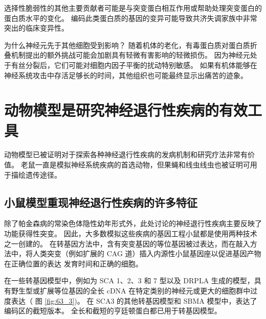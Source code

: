 选择性脆弱性的其他主要贡献者可能是与突变蛋白相互作用或帮助处理突变蛋白的蛋白质水平的变化。
编码此类蛋白质的基因的变异可能导致共济失调家族中非常突出的临床变异性。


为什么神经元先于其他细胞受到影响？
随着机体的老化，有毒蛋白质对蛋白质折叠机制提出的额外挑战可能会加剧具有轻微有害影响的轻微损伤。
因为神经元处于有丝分裂后，它们可能对细胞内因子平衡的扰动特别敏感。
如果有机体能够在神经系统攻击中存活足够长的时间，其他组织也可能最终显示出痛苦的迹象。



\section{动物模型是研究神经退行性疾病的有效工具}

动物模型已被证明对于探索各种神经退行性疾病的发病机制和研究疗法非常有价值。
老鼠一直是模拟神经系统疾病的首选动物，但果蝇和线虫线虫也被证明可用于描绘遗传途径。



\subsection{小鼠模型重现神经退行性疾病的许多特征}

除了帕金森病的常染色体隐性幼年形式外，此处讨论的神经退行性疾病主要反映了功能获得性突变。
因此，大多数模拟这些疾病的基因工程小鼠都是使用两种技术之一创建的。
在转基因方法中，含有突变基因的等位基因被过表达，而在敲入方法中，将人类突变（例如扩展的 CAG 道）插入内源性小鼠基因座以促进基因产物在正确位置的表达 发育时间和正确的细胞。


在一些转基因模型中，例如为 SCA 1、2、3 和 7 型以及 DRPLA 生成的模型，具有野生型或扩展等位基因的全长 cDNA 在特定类别的神经元或更大的细胞群中过度表达（ 图 \ref{fig:63_3})。
在 SCA3 的其他转基因模型和 SBMA 模型中，表达了编码区的截短版本。
全长和截短的亨廷顿蛋白都已用于转基因模型。


